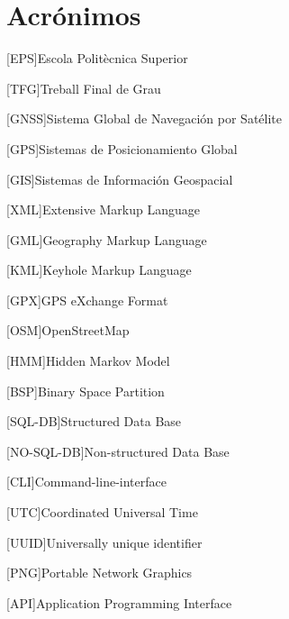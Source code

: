 \chapter{Acrónimos} %
%
%
\begin{acronym}

[EPS]{Escola Politècnica Superior}

[TFG]{Treball Final de Grau}

[GNSS]{Sistema Global de Navegación por Satélite}

[GPS]{Sistemas de Posicionamiento Global}

[GIS]{Sistemas de Información Geospacial}

[XML]{Extensive Markup Language}

[GML]{Geography Markup Language}

[KML]{Keyhole Markup Language}

[GPX]{GPS eXchange Format}

[OSM]{OpenStreetMap}

[HMM]{Hidden Markov Model}

[BSP]{Binary Space Partition}

[SQL-DB]{Structured Data Base}

[NO-SQL-DB]{Non-structured Data Base}

[CLI]{Command-line-interface}

[UTC]{Coordinated Universal Time}

[UUID]{Universally unique identifier}

[PNG]{Portable Network Graphics}

[API]{Application Programming Interface}

\end{acronym}
